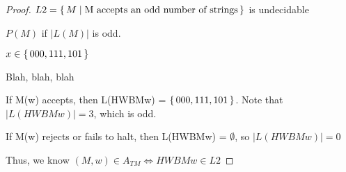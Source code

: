 \documentclass[letterpaper,10pt]{article}
\newcommand{\card}[1]{\left\vert{#1}\right\vert}
\begin{document}
\pagebreak


\begin{proof}
$ L2 = \set{M | \text{M accepts an odd number of strings} } $ is undecidable

$P(M)$ if $\card{L(M)}$ is odd.

$x \in \set{000, 111, 101}$

Blah, blah, blah

If M(w) accepts, then L(HWBMw) = $\set{000, 111, 101}$.  Note that 
$\card{L(HWBMw)} = 3$, which is odd.

If M(w) rejects or fails to halt, then L(HWBMw) = $\emptyset$, so
$\card{L(HWBMw)} = 0$

Thus, we know
$(M,w) \in A_{TM} \Leftrightarrow HWBMw \in L2$

\end{proof}
\end{document}
